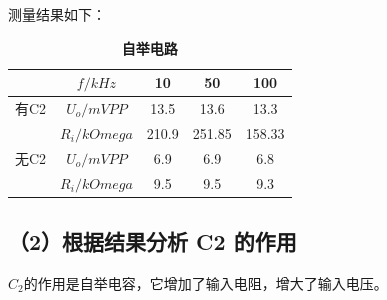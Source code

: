 \documentclass[UTF8]{ctexart}
\begin{document}
测量结果如下：
\begin{table}[H]
    \centering
    \caption{\label{表4}\textbf{自举电路}}
    \begin{tabular}{ccccc}
    \toprule
       & $f/kHz$ & 10 & 50 & 100\\
    \midrule
        有C2 & $U_{o}/mVPP$ & 13.5 & 13.6 & 13.3\\
        & $R_i / k Omega $ & 210.9 & 251.85 & 158.33 \\
        无C2 & $U_{o}/mVPP$ & 6.9 & 6.9 & 6.8 \\
        & $R_i / k Omega $ & 9.5 & 9.5 & 9.3 \\
    \bottomrule
    \end{tabular}
\end{table}

\subsection*{（2）根据结果分析 C2 的作用}

$C_2$的作用是自举电容，它增加了输入电阻，增大了输入电压。
\end{document}
